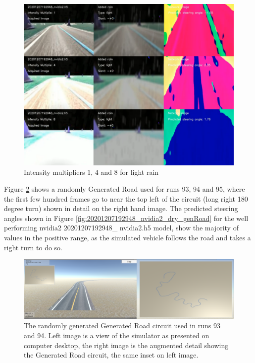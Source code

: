 \begin{figure}[ht]
 \centering 
 \includegraphics[width=\textwidth]{Figures/20201207192948_nvidia2_mult_1_4_8_light.png}
 \caption{Intensity multipliers 1, 4 and 8 for light rain}
 \label{fig:20201207192948_nvidia2_mult_1_4_8_light}
\end{figure}

Figure \ref{fig:run-93-94-generated-road} shows a randomly Generated Road used for runs 93, 94 and 95, where the first few hundred frames go to near the top left of the circuit (long right 180 degree turn) shown in detail on the right hand image. The predicted steering angles shown in Figure  \ref{fig:20201207192948_nvidia2_dry_genRoad} for the well performing nvidia2 20201207192948\_ nvidia2.h5 model, show the majority of values in the positive range, as the simulated vehicle follows the road and takes a right turn to do so.

\begin{figure}[ht]
 \centering 
 \includegraphics[width=\textwidth]{Figures/run-93-94-generated-road.png}
 \caption{The randomly generated Generated Road circuit used in runs 93 and 94. Left image is a view of the simulator as presented on computer desktop, the right image is the augmented detail showing the Generated Road circuit, the same inset on left image.}
 \label{fig:run-93-94-generated-road} 
\end{figure}

